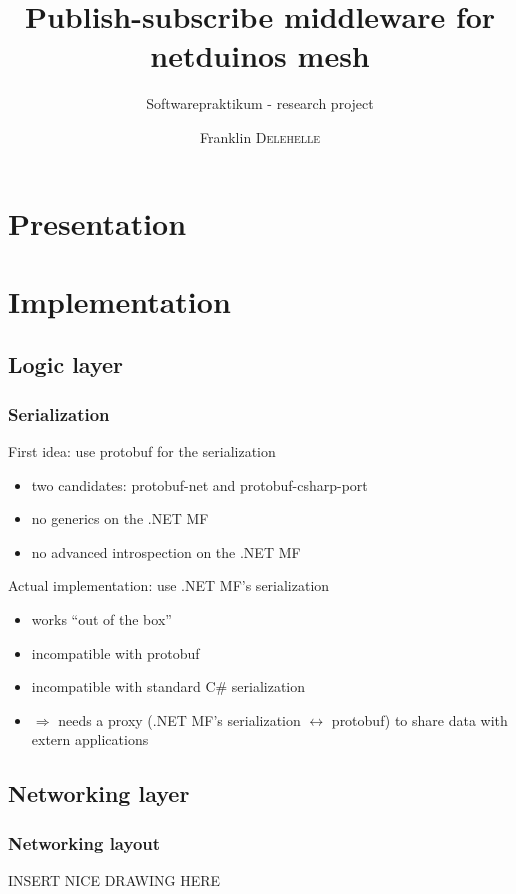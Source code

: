 \documentclass{beamer}
\title{Publish-subscribe middleware for netduinos mesh}
\subtitle{Softwarepraktikum - research project}
\author{Franklin \textsc{Delehelle}}
\date{}
\begin{document}
\begin{frame}
  \titlepage
\end{frame}

\section{Presentation}


\section{Implementation}
\subsection{Logic layer}
\subsubsection{Serialization}
\begin{frame}
  \begin{block}{First idea: use protobuf for the serialization}
    \begin{itemize}
    \item two candidates: protobuf-net and protobuf-csharp-port
    \item no generics on the .NET MF
    \item no advanced introspection on the .NET MF
    \end{itemize}
  \end{block}

  \begin{block}{Actual implementation: use .NET MF's serialization}
    \begin{itemize}
    \item works ``out of the box''
    \item incompatible with protobuf
    \item incompatible with standard C\# serialization
    \item $\Rightarrow$ needs a proxy (.NET MF's serialization $\leftrightarrow$ protobuf) to share data with extern applications
    \end{itemize}
  \end{block}
\end{frame}


\subsection{Networking layer}
\subsubsection{Networking layout}
\begin{frame}
  INSERT NICE DRAWING HERE
\end{frame}
\end{document}
